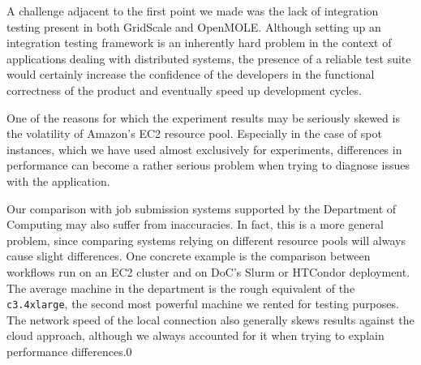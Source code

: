 A challenge adjacent to the first point we made was the lack of integration testing present in both GridScale and OpenMOLE. Although setting up an integration testing framework is an inherently hard problem in the context of applications dealing with distributed systems, the presence of a reliable test suite would certainly increase the confidence of the developers in the functional correctness of the product and eventually speed up development cycles.

One of the reasons for which the experiment results may be seriously skewed is the volatility of Amazon's EC2 resource pool. Especially in the case of spot instances, which we have used almost exclusively for experiments, differences in performance can become a rather serious problem when trying to diagnose issues with the application.

Our comparison with job submission systems supported by the Department of Computing may also suffer from inaccuracies. In fact, this is a more general problem, since comparing systems relying on different resource pools will always cause slight differences. One concrete example is the comparison between workflows run on an EC2 cluster and on DoC's Slurm or HTCondor deployment. The average machine in the department is the rough equivalent of the \verb|c3.4xlarge|, the second most powerful machine we rented for testing purposes. The network speed of the local connection also generally skews results against the cloud approach, although we always accounted for it when trying to explain performance differences.0